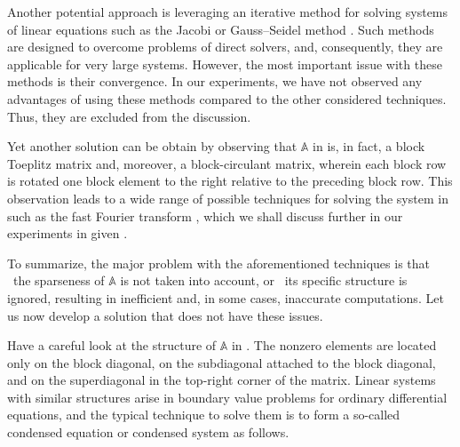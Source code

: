 Another potential approach is leveraging an iterative method for solving systems
of linear equations such as the Jacobi or Gauss--Seidel method \cite{press2007}.
Such methods are designed to overcome problems of direct solvers, and,
consequently, they are applicable for very large systems. However, the most
important issue with these methods is their convergence. In our experiments, we
have not observed any advantages of using these methods compared to the other
considered techniques. Thus, they are excluded from the discussion.

Yet another solution can be obtain by observing that $\mathbb{A}$ in
 is, in fact, a block Toeplitz matrix and,
moreover, a block-circulant matrix, wherein each block row is rotated one block
element to the right relative to the preceding block row. This observation leads
to a wide range of possible techniques for solving the system in
 such as the fast Fourier transform
\cite{mazancourt1983}, which we shall discuss further in our experiments in
given .

To summarize, the major problem with the aforementioned techniques is that
\one~the sparseness of $\mathbb{A}$ is not taken into account, or \two~its
specific structure is ignored, resulting in inefficient and, in some cases,
inaccurate computations. Let us now develop a solution that does not have these
issues.

Have a careful look at the structure of $\mathbb{A}$ in
. The nonzero elements are located only on the
block diagonal, on the subdiagonal attached to the block diagonal, and on the
superdiagonal in the top-right corner of the matrix. Linear systems with similar
structures arise in boundary value problems for ordinary differential equations,
and the typical technique to solve them is to form a so-called condensed
equation or condensed system \cite{stoer2002} as follows.

